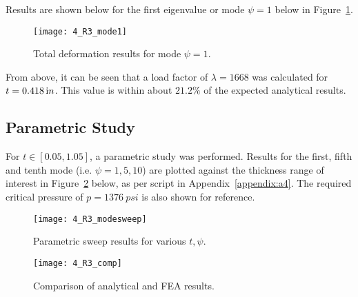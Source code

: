 Results are shown below for the first eigenvalue or mode $\psi = 1$ below in Figure~\ref{fig:4_R3_mode1}.
\begin{figure}[H]
	\centering
	\texttt{[image: 4\_R3\_mode1]}
	\caption{Total deformation results for mode $\psi = 1$.}
	\label{fig:4_R3_mode1}
\end{figure}

From above, it can be seen that a load factor of $\lambda = 1668$ was calculated for $t= 0.418\,\mathrm{i}n$. This value is within about $21.2\%$ of the expected analytical results.

\subsection{Parametric Study}

For $t\in [0.05, 1.05]$, a parametric study was performed. Results for the first, fifth and tenth mode (i.e. $\psi = 1, 5, 10$) are plotted against the thickness range of interest in Figure~\ref{fig:4_R3_modesweep} below, as per \cite{PYTHON} script in Appendix~\ref{appendix:a4}. The required critical pressure of $p =1376\ psi$ is also shown for reference.

\begin{figure}[H]
	\centering
	\texttt{[image: 4\_R3\_modesweep]}
	\caption{Parametric sweep results for various $t, \psi$.}
	\label{fig:4_R3_modesweep}
\end{figure}

\begin{figure}[H]
	\centering
	\texttt{[image: 4\_R3\_comp]}
	\caption{Comparison of analytical and FEA results.}
	\label{fig:4_R3_comp}
\end{figure}


